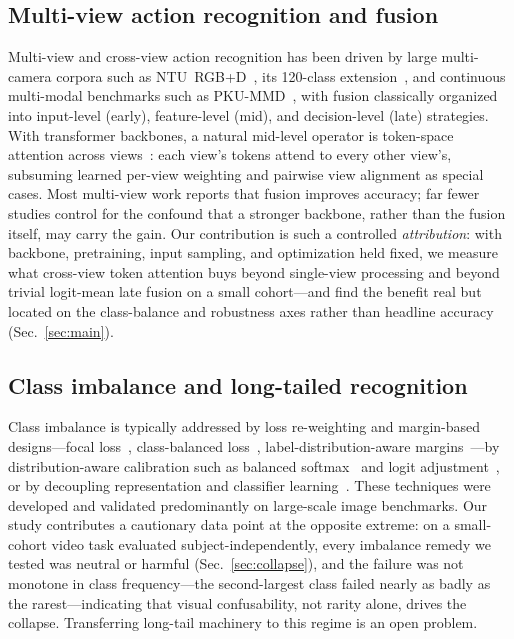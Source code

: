 \documentclass[journal]{IEEEtran}
\begin{document}
\subsection{Multi-view action recognition and fusion}
Multi-view and cross-view action recognition has been driven by large
multi-camera corpora such as NTU~RGB+D~\cite{shahroudy2016ntu}, its 120-class
extension~\cite{liu2020ntu120}, and continuous multi-modal benchmarks such
as PKU-MMD~\cite{liu2017pkummd}, with fusion classically organized into
input-level (early), feature-level (mid), and decision-level (late)
strategies.  With transformer backbones, a natural mid-level operator is
token-space attention across views~\cite{vaswani2017attention}: each view's
tokens attend to every other view's, subsuming learned per-view weighting
and pairwise view alignment as special cases.  Most multi-view work reports
that fusion improves accuracy; far fewer studies control for the confound
that a stronger backbone, rather than the fusion itself, may carry the
gain.  Our contribution is such a controlled \emph{attribution}: with
backbone, pretraining, input sampling, and optimization held fixed, we
measure what cross-view token attention buys beyond single-view processing
and beyond trivial logit-mean late fusion on a small cohort---and find the
benefit real but located on the class-balance and robustness axes rather
than headline accuracy (Sec.~\ref{sec:main}).

\subsection{Class imbalance and long-tailed recognition}
Class imbalance is typically addressed by loss re-weighting and
margin-based designs---focal loss~\cite{lin2017focal}, class-balanced
loss~\cite{cui2019classbalanced}, label-distribution-aware
margins~\cite{cao2019ldam}---by distribution-aware calibration such as
balanced softmax~\cite{ren2020balanced} and logit
adjustment~\cite{menon2021logit}, or by decoupling representation and
classifier learning~\cite{kang2020decoupling}.  These techniques were
developed and validated predominantly on large-scale image benchmarks.  Our
study contributes a cautionary data point at the opposite extreme: on a
small-cohort video task evaluated subject-independently, every imbalance
remedy we tested was neutral or harmful (Sec.~\ref{sec:collapse}), and the
failure was not monotone in class frequency---the second-largest class
failed nearly as badly as the rarest---indicating that visual
confusability, not rarity alone, drives the collapse.  Transferring
long-tail machinery to this regime is an open problem.
\end{document}
